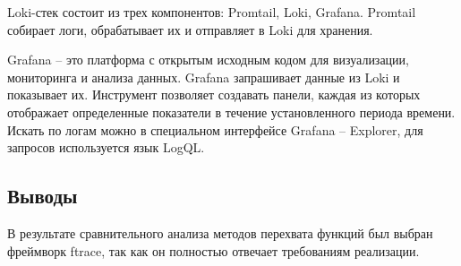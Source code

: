 Loki-стек состоит из трех компонентов: Promtail, Loki, Grafana. Promtail собирает логи, обрабатывает их и отправляет в Loki для хранения.

Grafana \cite{docgraf} -- это платформа с открытым исходным кодом для визуализации, мониторинга и анализа данных. Grafana запрашивает данные из Loki и показывает их. Инструмент позволяет создавать панели, каждая из которых отображает определенные показатели в течение установленного периода времени.
Искать по логам можно в специальном интерфейсе Grafana -- Explorer, для запросов используется язык LogQL.

\subsection*{Выводы}

В результате сравнительного анализа методов перехвата функций был выбран фреймворк ftrace, так как он полностью отвечает требованиям реализации.